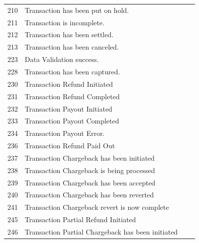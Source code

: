 \documentclass{article}
\newcommand{\cmark}{\ding{51}}
\newcommand{\xmark}{\ding{55}}
\begin{document}
\begin{longtable}{||c|p{7.5cm}||c||c||}
210 &Transaction has been put on hold.& \textcolor{red} {\xmark} & \textcolor{red} {\xmark}  \\
211 &Transaction is incomplete.& \textcolor{red} {\xmark} & \textcolor{red} {\xmark}  \\
212 &Transaction has been settled.& \textcolor{green} {\cmark} & \textcolor{red} {\xmark}  \\
213 &Transaction has been canceled.& \textcolor{red} {\xmark} & \textcolor{red} {\xmark}  \\
223 &Data Validation success.& \textcolor{red} {\xmark} & \textcolor{red} {\xmark}  \\
228 &Transaction has been captured.& \textcolor{green} {\cmark} & \textcolor{green} {\cmark}  \\
230 &Transaction Refund Initiated& \textcolor{green} {\cmark} & \textcolor{red} {\xmark}  \\
231 &Transaction Refund Completed& \textcolor{green} {\cmark} & \textcolor{red} {\xmark}  \\
232 &Transaction Payout Initiated& \textcolor{green} {\cmark} & \textcolor{green} {\cmark}  \\
233 &Transaction Payout Completed& \textcolor{green} {\cmark} & \textcolor{green} {\cmark}  \\
234 &Transaction Payout Error.& \textcolor{red} {\xmark} & \textcolor{red} {\xmark}  \\
236 &Transaction Refund Paid Out& \textcolor{green} {\cmark} & \textcolor{red} {\xmark}  \\
237 &Transaction Chargeback has been initiated& \textcolor{green} {\cmark} & \textcolor{red} {\xmark}  \\
238 &Transaction Chargeback is being processed& \textcolor{green} {\cmark} & \textcolor{red} {\xmark}  \\
239 &Transaction Chargeback has been accepted& \textcolor{green} {\cmark} & \textcolor{red} {\xmark}  \\
240 &Transaction Chargeback has been reverted& \textcolor{green} {\cmark} & \textcolor{red} {\xmark}  \\
241 &Transaction Chargeback revert is now complete& \textcolor{green} {\cmark} & \textcolor{red} {\xmark}  \\
245 &Transaction Partial Refund Initiated& \textcolor{green}{\cmark} & \textcolor{green}{\cmark} \\
246 &Transaction Partial Chargeback has been initiated& \textcolor{green}{\cmark} & \textcolor{green}{\cmark} \\

\end{longtable}
\end{document}
